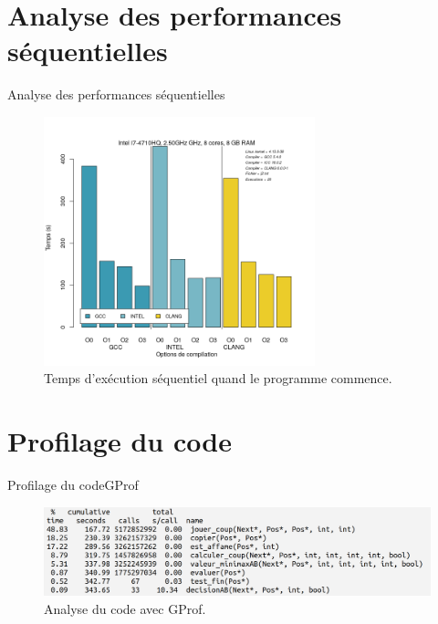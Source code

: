 \documentclass{beamer}
\begin{document}
\section{Analyse des performances séquentielles}

\begin{frame}{Analyse des performances séquentielles}

\begin{figure}
      \includegraphics[width=0.7\textwidth]{GCCvsICCvsCLANG_j2.png}
      \caption{Temps d’exécution séquentiel quand le programme commence.}
\end{figure}
\end{frame}

\section{Profilage du code}

\begin{frame}{Profilage du code}{GProf}
\begin{figure}
        \includegraphics[width=\textwidth]{gprof.png}
        \caption{Analyse du code avec GProf.\label{Fig:GProf}}
\end{figure}
\end{frame}
\end{document}
